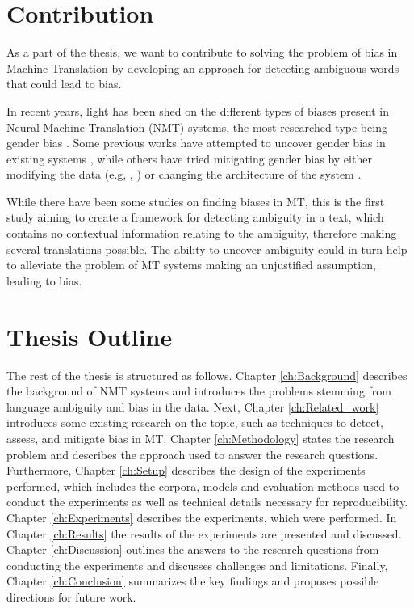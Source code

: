 
\section{Contribution}
\label{sec:Introduction:Contribution}

As a part of the thesis, we want to contribute to solving the problem of bias in Machine Translation by developing an approach for detecting ambiguous words that could lead to bias. 

In recent years, light has been shed on the different types of biases present in Neural Machine Translation (NMT) systems, the most researched type being gender bias \parencite{Savoldi_2021}. Some previous works have attempted to uncover gender bias in existing systems \parencite{Prates_2019}, while others have tried mitigating gender bias by either modifying the data (e.g, \citet{Escud_Font_2019}, \citet{Stanovsky_2019}) or changing the architecture of the system \parencite{Vanmassenhove_2018}. 

While there have been some studies on finding biases in MT, this is the first study aiming to create a framework for detecting ambiguity in a text, which contains no contextual information relating to the ambiguity, therefore making several translations possible. The ability to uncover ambiguity could in turn help to alleviate the problem of MT systems making an unjustified assumption, leading to bias.


\section{Thesis Outline}
\label{sec:Introduction:Outline}
The rest of the thesis is structured as follows. Chapter \ref{ch:Background} describes the background of NMT systems and introduces the problems stemming from language ambiguity and bias in the data. Next, Chapter \ref{ch:Related_work} introduces some existing research on the topic, such as techniques to detect, assess, and mitigate bias in MT. Chapter \ref{ch:Methodology} states the research problem and describes the approach used to answer the research questions. Furthermore, Chapter \ref{ch:Setup} describes the design of the experiments performed, which includes the corpora, models and evaluation methods used to conduct the experiments as well as technical details necessary for reproducibility. Chapter \ref{ch:Experiments} describes the experiments, which were performed. In Chapter \ref{ch:Results} the results of the experiments are presented and discussed. Chapter \ref{ch:Discussion} outlines the answers to the research questions from conducting the experiments and discusses challenges and limitations. Finally, Chapter \ref{ch:Conclusion} summarizes the key findings and proposes possible directions for future work.